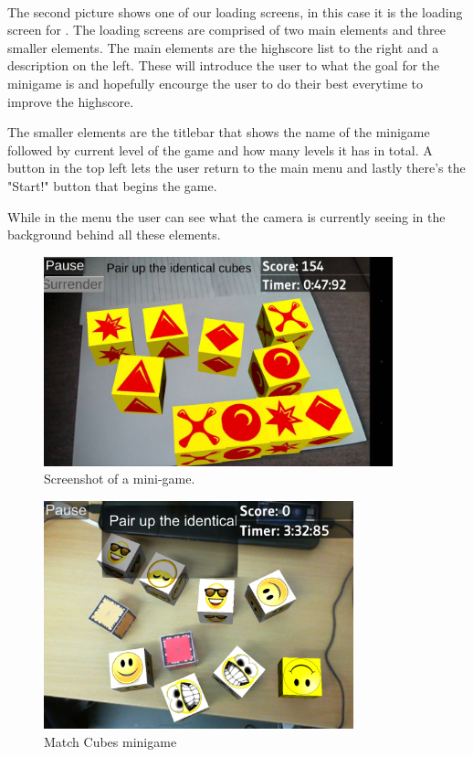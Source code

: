 \paragraph{}
The second picture shows one of our loading screens, in this case it is the loading screen for .
The loading screens are comprised of two main elements and three smaller elements.
The main elements are the highscore list to the right and a description on the left.
These will introduce the user to what the goal for the minigame is and hopefully encourge the user to do their best everytime to improve the highscore.

The smaller elements are the titlebar that shows the name of the minigame followed by current level of the game and how many levels it has in total.
A button in the top left lets the user return to the main menu and lastly there's the "Start!" button that begins the game.

While in the menu the user can see what the camera is currently seeing in the background behind all these elements.

\begin{figure}[h]
	\centering
	\begin{minipage}{.5\textwidth}
		\capstart
		\centering
		\includegraphics[width=0.9\textwidth]{images/match_cubes.jpg}
		\vspace{-10pt}
		\caption{Screenshot of a mini-game.}
		\label{fig:screenshot_mini-game}
	\end{minipage}
\end{figure}

\begin{figure}[ht]
	\capstart
	\centering
	\includegraphics[width=0.8\textwidth]{images/MatchCubes}
	\caption{Match Cubes minigame}
	\label{fig:match_cubes}
\end{figure}

